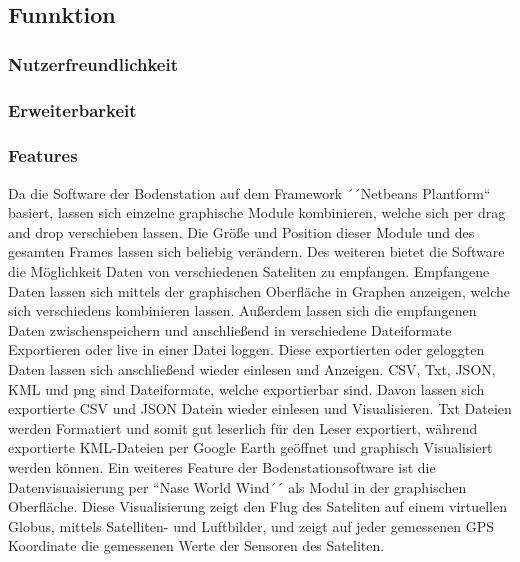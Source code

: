 \subsection{Funnktion}
\subsubsection{Nutzerfreundlichkeit}



\subsubsection{Erweiterbarkeit}


\subsubsection{Features}
Da die Software der Bodenstation auf dem Framework ´´Netbeans Plantform`` basiert, lassen sich einzelne graphische Module kombinieren, welche sich per drag and drop verschieben lassen. Die Größe und Position dieser Module und des gesamten Frames lassen sich beliebig verändern. Des weiteren bietet die Software die Möglichkeit Daten von verschiedenen Sateliten zu empfangen. Empfangene Daten lassen sich mittels der graphischen Oberfläche in Graphen anzeigen, welche sich verschiedens kombinieren lassen. Außerdem lassen sich die empfangenen Daten zwischenspeichern und anschließend in verschiedene Dateiformate Exportieren oder live in einer Datei loggen. Diese exportierten oder geloggten Daten lassen sich anschließend wieder einlesen und Anzeigen. CSV, Txt, JSON, KML und png sind Dateiformate, welche exportierbar sind. Davon lassen sich exportierte CSV und JSON Datein wieder einlesen und Visualisieren. Txt Dateien werden Formatiert und somit gut leserlich für den Leser exportiert, während exportierte KML-Dateien per Google Earth geöffnet und graphisch Visualisiert werden können. Ein weiteres Feature der Bodenstationsoftware ist die Datenvisuaisierung per ``Nase World Wind´´ als Modul in der graphischen Oberfläche. Diese Visualisierung zeigt den Flug des Sateliten auf einem virtuellen Globus, mittels Satelliten- und Luftbilder, und zeigt auf jeder gemessenen GPS Koordinate die gemessenen Werte der Sensoren des Sateliten.
